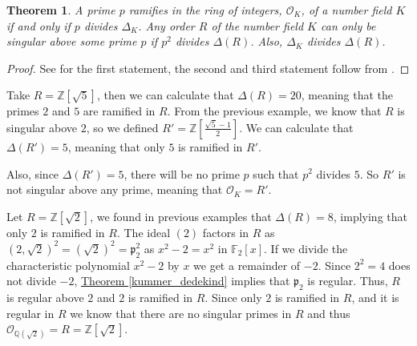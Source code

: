 \documentclass[openany, a4paper, 10pt]{book}
\theoremstyle{plain}
\newtheorem{theorem}{Theorem}[chapter]
\theoremstyle{plain}
\theoremstyle{plain}
\theoremstyle{definition}
\theoremstyle{plain}
\theoremstyle{definition}
\theoremstyle{remark}
\newcommand{\theoref}[1]{\hyperref[#1]{Theorem \ref{#1}}}
\begin{document}
\begin{theorem}\label{ram_squarefree}
    A prime $p$ ramifies in the ring of integers, $\mathcal O_K$, of a number field $K$ if and only if $p$ divides $\Delta_K$.
    Any order $R$ of the number field $K$ can only be singular above some prime $p$ if $p^2$ divides $\Delta(R)$.
    Also, $\Delta_K$ divides $\Delta(R)$.
\end{theorem}
\begin{proof}
    See \cite[Theorem~4.14]{ANT_dictaat} for the first statement, the second and third statement follow from \cite[Theorems~4.7,4.10]{ANT_dictaat}.
\end{proof}

\begin{examplebox}
    Take $R = \mathbb Z[\sqrt{5}]$, then we can calculate that $\Delta(R) = 20$, meaning that the primes $2$ and $5$ are ramified in $R$.
    From the previous example, we know that $R$ is singular above $2$, so we defined
    $R' = \mathbb Z[\frac{\sqrt{5}-1}{2}]$.
    We can calculate that $\Delta(R') = 5$, meaning that only $5$ is ramified in $R'$.

    Also, since $\Delta(R')=5$, there will be no prime $p$ such that $p^2$ divides $5$.
    So $R'$ is not singular above any prime, meaning that $\mathcal O_K = R'$.

    \tcbline

    Let $R = \mathbb Z[\sqrt{2}]$, we found in previous examples that $\Delta(R) = 8$, implying that only $2$ is ramified in $R$.
    The ideal $(2)$ factors in $R$ as $(2,\sqrt{2})^2 = (\sqrt{2})^2 =\mathfrak p_2^2$ as $x^2-2 = x^2$ in $\mathbb F_2[x]$.
    If we divide the characteristic polynomial $x^2-2$ by $x$ we get a remainder of $-2$.
    Since $2^2=4$ does not divide $-2$, \theoref{kummer_dedekind} implies that $\mathfrak p_2$ is regular.
    Thus, $R$ is regular above $2$ and $2$ is ramified in $R$.
    Since only $2$ is ramified in $R$, and it is regular in $R$ we know that there are no singular primes in $R$ and thus
    $\mathcal O_{\mathbb Q(\sqrt{2})} = R = \mathbb Z[\sqrt{2}]$.
\end{examplebox}
\end{document}
